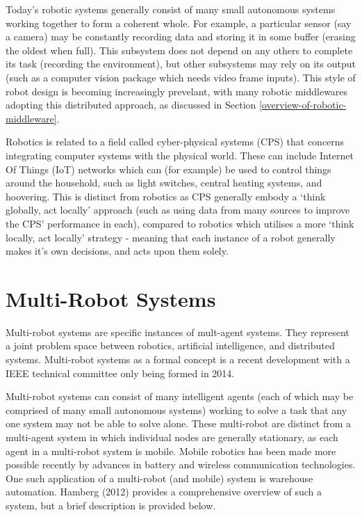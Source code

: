 \documentclass[../dissertation.tex]{subfiles}
\begin{document}
Today's robotic systems generally consist of many small autonomous systems working together to form a coherent whole\cite{4058987}. For example, a particular sensor (say a camera) may be constantly recording data and storing it in some buffer (erasing the oldest when full). This subsystem does not depend on any others to complete its task (recording the environment), but other subsystems may rely on its output (such as a computer vision package which needs video frame inputs). This style of robot design is becoming increasingly prevelant, with many robotic middlewares adopting this distributed approach, as discussed in Section \ref{overview-of-robotic-middleware}.

Robotics is related to a field called cyber-physical systems (CPS) that concerns integrating computer systems with the physical world\cite{Lee:EECS-2008-8}. These can include Internet Of Things (IoT) networks\cite{atzori2010internet} which can (for example) be used to control things around the household, such as light switches, central heating systems, and hoovering. This is distinct from robotics as CPS generally embody a `think globally, act locally' approach\cite{gordonthink} (such as using data from many sources to improve the CPS' performance in each), compared to robotics which utilises a more `think locally, act locally' strategy - meaning that each instance of a robot generally makes it's own decisions, and acts upon them solely.

\section{Multi-Robot Systems}

Multi-robot systems are specific instances of mult-agent systems. They represent a joint problem space between robotics, artificial intelligence, and distributed systems. Multi-robot systems as a formal concept is a recent development with a IEEE technical committee only being formed in 2014\cite{MultiRobotSystemsIEEECommittee}.

Multi-robot systems can consist of many intelligent agents (each of which may be comprised of many small autonomous systems) working to solve a task that any one system may not be able to solve alone. These multi-robot are distinct from a multi-agent system in which individual nodes are generally stationary, as each agent in a multi-robot system is mobile\cite{doi:10.5772/57313}. Mobile robotics has been made more possible recently by advances in battery\cite{estrin2002connecting} and wireless communication\cite{cordeiro2010ieee} technologies. One such application of a multi-robot (and mobile) system is warehouse automation. Hamberg (2012)\cite{hamberg2012automation} provides a comprehensive overview of such a system, but a brief description is provided below.
\end{document}
